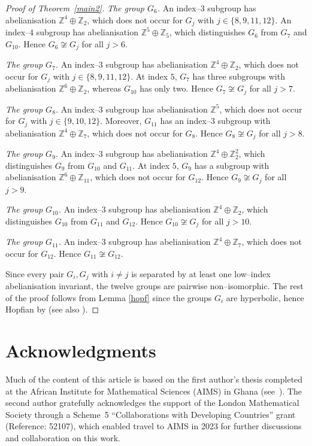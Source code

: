 \documentclass[a4paper,12pt,oneside]{article}
\begin{document}
\begin{proof}[Proof of Theorem~\ref{main2}]
\medskip
\noindent\emph{The group $G_6$.}  
An index--$3$ subgroup has abelianisation $\mathbb Z^4\oplus\mathbb Z_2$, which does not occur for $G_j$ with $j\in\{8,9,11,12\}$.  
An index--$4$ subgroup has abelianisation $\mathbb Z^5\oplus\mathbb Z_5$, which distinguishes $G_6$ from $G_7$ and $G_{10}$.  
Hence $G_6\not\cong G_j$ for all $j>6$.

\medskip
\noindent\emph{The group $G_7$.}  
An index--$3$ subgroup has abelianisation $\mathbb Z^4\oplus\mathbb Z_2$, which does not occur for $G_j$ with $j\in\{8,9,11,12\}$.  
At index $5$, $G_7$ has three subgroups with abelianisation $\mathbb Z^6\oplus\mathbb Z_2$, whereas $G_{10}$ has only two.  
Hence $G_7\not\cong G_j$ for all $j>7$.

\medskip
\noindent\emph{The group $G_8$.}  
An index--$3$ subgroup has abelianisation $\mathbb Z^5$, which does not occur for $G_j$ with $j\in\{9,10,12\}$.  
Moreover, $G_{11}$ has an index--$3$ subgroup with abelianisation $\mathbb Z^4\oplus\mathbb Z_7$, which does not occur for $G_8$.  
Hence $G_8\not\cong G_j$ for all $j>8$.

\medskip
\noindent\emph{The group $G_9$.}  
An index--$3$ subgroup has abelianisation $\mathbb Z^4\oplus\mathbb Z_2^2$, which distinguishes $G_9$ from $G_{10}$ and $G_{11}$.  
At index $5$, $G_9$ has a subgroup with abelianisation $\mathbb Z^6\oplus\mathbb Z_{11}$, which does not occur for $G_{12}$.  
Hence $G_9\not\cong G_j$ for all $j>9$.

\medskip
\noindent\emph{The group $G_{10}$.}  
An index--$3$ subgroup has abelianisation $\mathbb Z^4\oplus\mathbb Z_2$, which distinguishes $G_{10}$ from $G_{11}$ and $G_{12}$.  
Hence $G_{10}\not\cong G_j$ for all $j>10$.

\medskip
\noindent\emph{The group $G_{11}$.}  
An index--$3$ subgroup has abelianisation $\mathbb Z^4\oplus\mathbb Z_7$, which does not occur for $G_{12}$.  
Hence $G_{11}\not\cong G_{12}$.

\medskip
Since every pair $G_i,G_j$ with $i\neq j$ is separated by at least one low--index abelianisation invariant, the twelve groups are pairwise non--isomorphic.  The rest of the proof follows from Lemma \ref{hopf} since the groups $G_i$ are hyperbolic, hence Hopfian by \cite[Corollary 2.9]{MR4623546} (see also \cite{MR4140867,MR1660337}).
\end{proof}

\section*{Acknowledgments}
Much of the content of this article is based on the first author's thesis completed at the African Institute for Mathematical Sciences (AIMS) in Ghana (see~\cite{thesis}). The second author gratefully acknowledges the support of the London Mathematical Society through a Scheme~5 ``Collaborations with Developing Countries'' grant (Reference: 52107), which enabled travel to AIMS in 2023 for further discussions and collaboration on this work.
\end{document}
